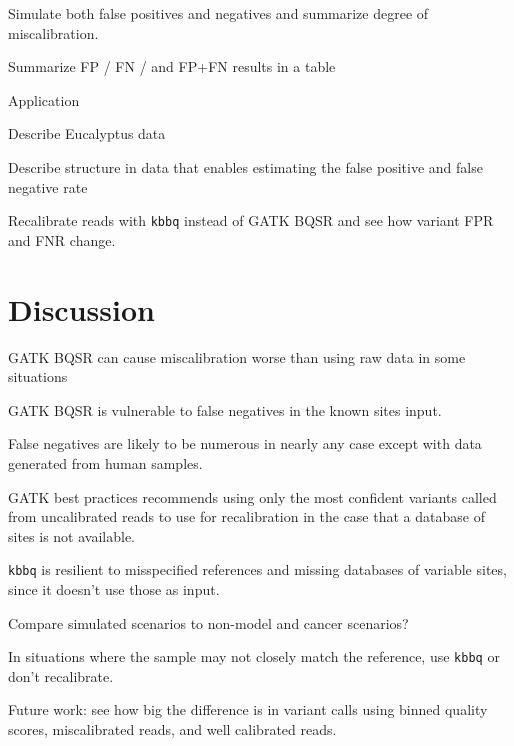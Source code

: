 \documentclass{article}
\begin{document}
\begin{outline}
\begin{outline}
	\end{outline}	
	\item Simulate both false positives and negatives and summarize degree of miscalibration.
	\item Summarize FP / FN / and FP+FN results in a table
	\item Application
	\begin{outline}
		\item Describe Eucalyptus data
		\item Describe structure in data that enables estimating the false positive and false negative rate
		\item Recalibrate reads with \texttt{kbbq} instead of GATK BQSR and see how variant FPR and FNR change.
	\end{outline}
\end{outline}
\section{Discussion}
\begin{outline}
	\item GATK BQSR can cause miscalibration worse than using raw data in some situations
	\item GATK BQSR is vulnerable to false negatives in the known sites input.
	\begin{outline}
		\item False negatives are likely to be numerous \parencite{bobo_false_2016} in nearly any case except with data generated from human samples.
		\item GATK best practices recommends using only the most confident variants called from uncalibrated reads to use for recalibration in the case that a database of sites is not available.
	\end{outline}
	\item \texttt{kbbq} is resilient to misspecified references and missing databases of variable sites, since it doesn't use those as input.
	\item Compare simulated scenarios to non-model and cancer scenarios?
	\begin{outline}
		\item In situations where the sample may not closely match the reference, use \texttt{kbbq} or don't recalibrate.
	\end{outline}
	\item Future work: see how big the difference is in variant calls using binned quality scores, miscalibrated reads, and well calibrated reads.
\end{outline}

\printbibliography
\end{document}
